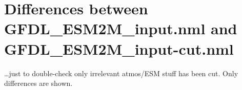 \documentclass[10pt]{article}
\newcommand{\nmldiffer}[1]{#1} %
\newcommand{\doscript}[1]{{\footnotesize\textsf{}}}
\begin{document}
\newpage
\renewcommand{\nmldiffer}[1]{#1} %
\section{Differences between GFDL_ESM2M_input.nml and GFDL_ESM2M_input-cut.nml}
\ldots just to double-check only irrelevant atmos/ESM stuff has been cut. Only differences are shown. 
\doscript{/Users/andy/anaconda/bin/python3 /Users/andy/bin/nmltab.py -d --format latex original/GFDL_ESM2M_input.nml original/GFDL_ESM2M_input-cut.nml}
\end{document}
